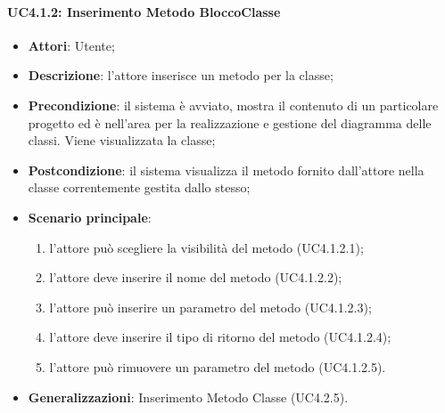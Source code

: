 

\paragraph{UC4.1.2: Inserimento Metodo BloccoClasse}
\label{UC4.1.2}
\begin{itemize}
	\item \textbf{Attori}: Utente;
	\item \textbf{Descrizione}: l'attore inserisce un metodo per la classe;
	\item \textbf{Precondizione}:  il sistema è avviato, mostra il contenuto di un particolare progetto ed è nell'area per la realizzazione e gestione del diagramma delle classi. Viene visualizzata la classe;
	\item \textbf{Postcondizione}: il sistema visualizza il metodo fornito dall'attore nella classe correntemente gestita dallo stesso;
	\item \textbf{Scenario principale}:
	\begin{enumerate}
		\item l'attore può scegliere la visibilità del metodo (UC4.1.2.1);
		\item l'attore deve inserire il nome del metodo (UC4.1.2.2);
		\item l'attore può inserire un parametro del metodo (UC4.1.2.3);
		\item l'attore deve inserire il tipo di ritorno del metodo (UC4.1.2.4);
		\item l'attore può rimuovere un parametro del metodo (UC4.1.2.5).
	\end{enumerate}
	\item \textbf{Generalizzazioni}: Inserimento Metodo Classe (UC4.2.5).%
\end{itemize}


